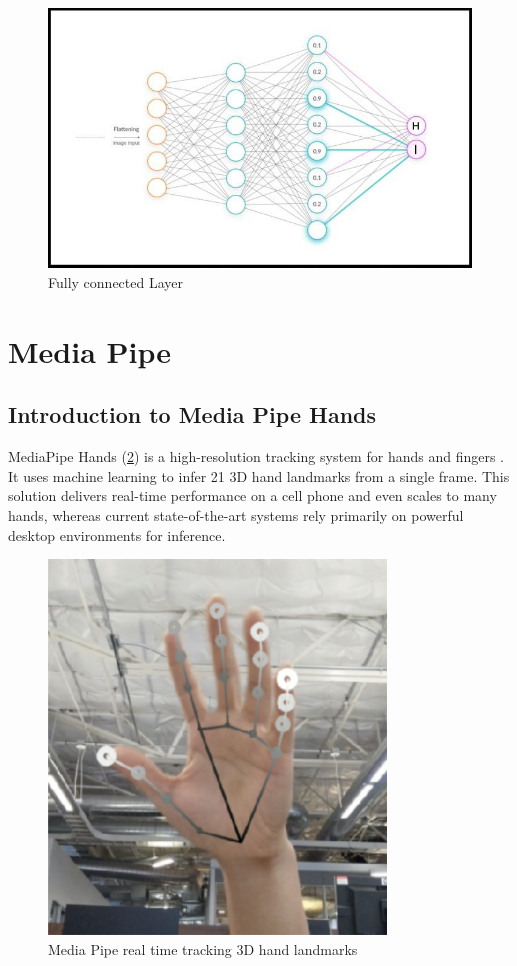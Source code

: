 \begin{figure}[H]
	\centering
	\includegraphics[width=\textwidth]{img/Chap3/FC}
	\caption{ Fully connected Layer}
	\label{fig:Chap3-FC}
\end{figure}
\section{Media Pipe}\label{sec:MediaPipe}
\subsection{Introduction to Media Pipe Hands}
MediaPipe Hands (\ref{fig:Chap3-MediaPipe}) is a high-resolution tracking system for hands and fingers \cite{zhang2020mediapipe}. It uses machine learning to infer 21 3D hand landmarks from a single frame. This solution delivers real-time performance on a cell phone and even scales to many hands, whereas current state-of-the-art systems rely primarily on powerful desktop environments for inference.

\begin{figure}[H]
	\centering
	\includegraphics[width=0.8\textwidth]{img/Chap3/Media Pipe}
	\caption{ Media Pipe real time tracking 3D hand landmarks}
	\label{fig:Chap3-MediaPipe}
\end{figure}

